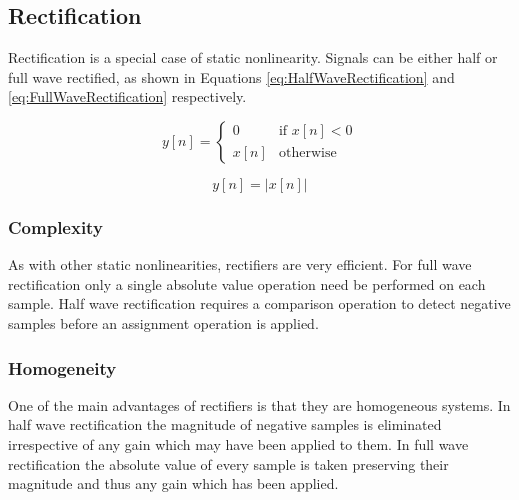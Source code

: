 			

	\subsection{Rectification}
	\label{sec:Excitation-Rectification}
		Rectification is a special case of static nonlinearity. Signals can be either half or full wave rectified,
		as shown in Equations \ref{eq:HalfWaveRectification} and \ref{eq:FullWaveRectification} respectively.

		\begin{equation}
			y[n] = \begin{cases}
				0 & \text{if $x[n] < 0$} \\
				x[n] & \text{otherwise}
			\end{cases}
			\label{eq:HalfWaveRectification}
		\end{equation}

		\begin{equation}
			y[n] = |x[n]|
			\label{eq:FullWaveRectification}
		\end{equation}

		\subsubsection*{Complexity}
			As with other static nonlinearities, rectifiers are very efficient. For full wave rectification
			only a single absolute value operation need be performed on each sample. Half wave rectification
			requires a comparison operation to detect negative samples before an assignment operation is
			applied.

		\subsubsection*{Homogeneity}
			One of the main advantages of rectifiers is that they are homogeneous systems. In half wave
			rectification the magnitude of negative samples is eliminated irrespective of any gain which may
			have been applied to them. In full wave rectification the absolute value of every sample is taken
			preserving their magnitude and thus any gain which has been applied.

